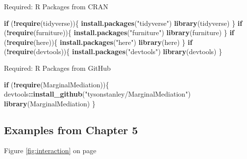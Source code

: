 \documentclass[]{DissertateCUNY}
\newenvironment{Shaded}{\begin{snugshade}}{\end{snugshade}}
\newcommand{\KeywordTok}[1]{\textcolor[rgb]{0.13,0.29,0.53}{\textbf{#1}}}
\newcommand{\StringTok}[1]{\textcolor[rgb]{0.31,0.60,0.02}{#1}}
\newcommand{\ControlFlowTok}[1]{\textcolor[rgb]{0.13,0.29,0.53}{\textbf{#1}}}
\newcommand{\OperatorTok}[1]{\textcolor[rgb]{0.81,0.36,0.00}{\textbf{#1}}}
\newcommand{\NormalTok}[1]{#1}
\begin{document}
\singlespace

Required: R Packages from CRAN

\small

\begin{Shaded}
\begin{Highlighting}[]
\ControlFlowTok{if}\NormalTok{ (}\OperatorTok{!}\KeywordTok{require}\NormalTok{(tidyverse))\{}
  \KeywordTok{install.packages}\NormalTok{(}\StringTok{"tidyverse"}\NormalTok{)}
  \KeywordTok{library}\NormalTok{(tidyverse)}
\NormalTok{\}}
\ControlFlowTok{if}\NormalTok{ (}\OperatorTok{!}\KeywordTok{require}\NormalTok{(furniture))\{}
  \KeywordTok{install.packages}\NormalTok{(}\StringTok{"furniture"}\NormalTok{)}
  \KeywordTok{library}\NormalTok{(furniture)}
\NormalTok{\}}
\ControlFlowTok{if}\NormalTok{ (}\OperatorTok{!}\KeywordTok{require}\NormalTok{(here))\{}
  \KeywordTok{install.packages}\NormalTok{(}\StringTok{"here"}\NormalTok{)}
  \KeywordTok{library}\NormalTok{(here)}
\NormalTok{\}}
\ControlFlowTok{if}\NormalTok{ (}\OperatorTok{!}\KeywordTok{require}\NormalTok{(devtools))\{}
  \KeywordTok{install.packages}\NormalTok{(}\StringTok{"devtools"}\NormalTok{)}
  \KeywordTok{library}\NormalTok{(devtools)}
\NormalTok{\}}
\end{Highlighting}
\end{Shaded}

\normalsize

Required: R Packages from GitHub

\small

\begin{Shaded}
\begin{Highlighting}[]
\ControlFlowTok{if}\NormalTok{ (}\OperatorTok{!}\KeywordTok{require}\NormalTok{(MarginalMediation))\{}
\NormalTok{  devtools}\OperatorTok{::}\KeywordTok{install_github}\NormalTok{(}\StringTok{"tysonstanley/MarginalMediation"}\NormalTok{)}
  \KeywordTok{library}\NormalTok{(MarginalMediation)}
\NormalTok{\}}
\end{Highlighting}
\end{Shaded}

\normalsize

\clearpage

\subsection*{Examples from Chapter 5}\label{examples-from-chapter-5}

Figure \ref{fig:interaction} on page \pageref{fig:interaction}
\end{document}
